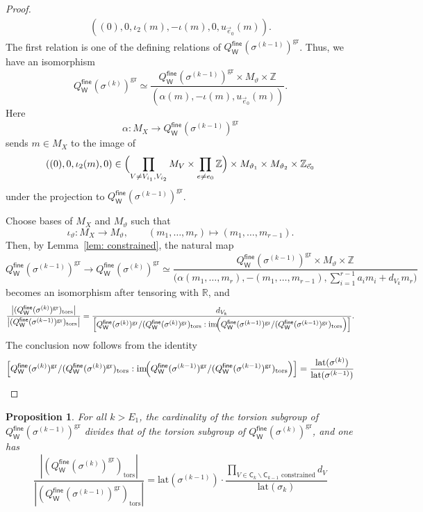 \documentclass{article}
\newtheorem{proposition}[definition]{Proposition}
\newcommand{\tropC}{\mathsf{C}}
\newcommand{\gr}{\mathrm{gr}}
\newcommand{\tors}{\mathrm{tors}}
\newcommand{\fine}{\mathsf{fine}}
\newcommand{\W}{\mathsf{W}}
\begin{document}
\begin{proof}
\begin{align*}
            ((0), 0, \iota_2(m) , -\iota(m), 0, u_{\vec{e}_0}(m)). 
    \end{align*}
    The first relation is one of the defining relations of $Q_{\W}^{\fine}(\sigma^{(k-1)})^{\gr}$. Thus, we have an isomorphism
\[
Q_{\W}^{\fine}(\sigma^{(k)})^{\gr}
\simeq
\frac{
Q_{\W}^{\fine}(\sigma^{(k-1)})^{\gr}
\times M_{\vartheta}
\times \mathbb{Z}
}{
(\alpha(m),-\iota(m),u_{\vec e_0}(m))
}.
\]
Here
\[
\alpha:M_X\longrightarrow Q_\W^\fine(\sigma^{(k-1)})^{\gr}
\]
sends $m\in M_X$ to the image of
\[
((0),0,\iota_2(m),0)
\in
\Bigl(
\prod_{V\neq V_{i_1},V_{i_2}} M_V
\times
\prod_{e\neq e_0}\mathbb Z
\Bigr)
\times M_{\vartheta_1}
\times M_{\vartheta_2}
\times \mathbb Z_{\vec e_0}
\]
under the projection to $Q_\W^\fine(\sigma^{(k-1)})^{\gr}$.

Choose bases of $M_X$ and $M_{\vartheta}$ such that
\[
\iota_\vartheta:M_X\to M_\vartheta,
\qquad
(m_1,\ldots,m_r)\longmapsto (m_1,\ldots,m_{r-1}).
\]
Then, by Lemma~\ref{lem: constrained}, the natural map
\[
Q_\W^\fine(\sigma^{(k-1)})^\gr
\longrightarrow
Q_{\W}^{\fine}(\sigma^{(k)})^{\gr}
\simeq
\frac{
Q_{\W}^{\fine}(\sigma^{(k-1)})^{\gr}
\times M_{\vartheta}
\times \mathbb{Z}
}{
\bigl(
\alpha(m_1,\ldots,m_r),
-(m_1,\ldots,m_{r-1}),
\sum_{i=1}^{r-1} a_i m_i + d_{V_k}m_r
\bigr)
}
\]
becomes an isomorphism after tensoring with $\mathbb R$, and
\[
\frac{\bigl|(Q_\W^\fine(\sigma^{(k)})^{\gr})_{\tors}\bigr|}
     {\bigl|(Q_\W^\fine(\sigma^{(k-1)})^{\gr})_{\tors}\bigr|}
=
\frac{d_{V_k}}
{\left[
Q_\W^\fine(\sigma^{(k)})^{\gr}/(Q_\W^\fine(\sigma^{(k)})^{\gr})_{\tors}
:
\operatorname{im}\!\Bigl(
Q_\W^\fine(\sigma^{(k-1)})^{\gr}/(Q_\W^\fine(\sigma^{(k-1)})^{\gr})_{\tors}
\Bigr)
\right]}.
\]
The conclusion now follows from the identity
$$
\left[
Q_\W^\fine(\sigma^{(k)})^{\gr}/(Q_\W^\fine(\sigma^{(k)})^{\gr})_{\tors}
:
\operatorname{im}\!\Bigl(
Q_\W^\fine(\sigma^{(k-1)})^{\gr}/(Q_\W^\fine(\sigma^{(k-1)})^{\gr})_{\tors}
\Bigr)
\right]= \frac{ \mathrm{lat}(\sigma^{(k)})}{\mathrm{lat}(\sigma^{(k-1)})}
$$
    
\end{proof}



\begin{proposition}\label{prop: inductive step}
    For all $ k>E_1$, the cardinality of the torsion subgroup of $Q^\fine_\W(\sigma^{(k-1)})^{\gr}$ divides that of the torsion subgroup of $Q^\fine_\W(\sigma^{(k)})^{\gr}$, and one has 
    $$  \frac{|(Q^\fine_\W(\sigma^{(k)})^{\gr})_{\tors}|}{|(Q^\fine_\W(\sigma^{(k-1)})^{\gr})_{\tors}|} = \mathrm{lat}(\sigma^{(k-1)})  \cdot \frac{\prod_{V \in \tropC_k \smallsetminus \tropC_{k-1} \text{ constrained}} d_V}{\mathrm{lat}(\sigma_k)}
    $$  
\end{proposition}
\end{document}
